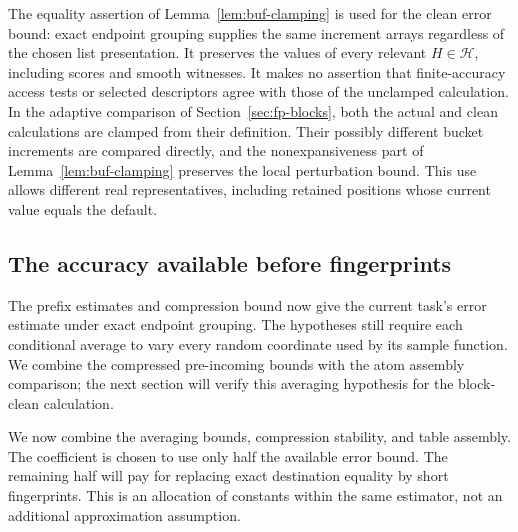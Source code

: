The equality assertion of Lemma~\ref{lem:buf-clamping} is used for the
clean error bound: exact endpoint grouping supplies the same increment
arrays regardless of the chosen list presentation.  It preserves the
values of every relevant $H\in\mathcal H$, including scores and smooth
witnesses.  It makes no assertion that finite-accuracy access tests or
selected descriptors agree with those of the unclamped calculation.
In the adaptive comparison of Section~\ref{sec:fp-blocks}, both the actual
and clean calculations are clamped from their definition.  Their
possibly different bucket increments are compared directly, and the
nonexpansiveness part of Lemma~\ref{lem:buf-clamping} preserves the local
perturbation bound.  This use allows different real representatives,
including retained positions whose current value equals the default.

\subsection{The accuracy available before fingerprints}

The prefix estimates and compression bound now give the current task's
error estimate under exact endpoint grouping.  The hypotheses still
require each conditional average to vary every random coordinate used
by its sample function.  We combine the compressed pre-incoming bounds
with the atom assembly comparison; the next section will verify this
averaging hypothesis for the block-clean calculation.

We now combine the averaging bounds, compression stability, and table assembly. The coefficient is chosen to use only half the available error bound. The remaining half will pay for replacing exact destination equality by short fingerprints. This is an allocation of constants within the same estimator, not an additional approximation assumption.

